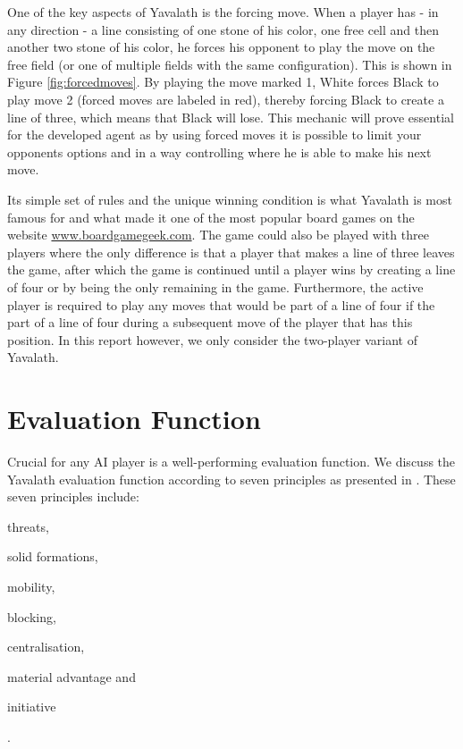 \documentclass[11pt]{article}
\begin{document}


One of the key aspects of Yavalath is the forcing move. When a player has - in any direction - a line consisting of one stone of his color, one free cell and then another two stone of his color, he forces his opponent to play the move on the free field (or one of multiple fields with the same configuration). This is shown in Figure \ref{fig:forcedmoves}. By playing the move marked 1, White forces Black to play move 2 (forced moves are labeled in red), thereby forcing Black to create a line of three, which means that Black will lose. This mechanic will prove essential for the developed agent as by using forced moves it is possible to limit your opponents options and in a way controlling where he is able to make his next move.



Its simple set of rules and the unique winning condition is what Yavalath is most famous for and what made it one of the most popular board games on the website \url{www.boardgamegeek.com}. The game could also be played with three players where the only difference is that a player that makes a line of three leaves the game, after which the game is continued until a player wins by creating a line of four or by being the only remaining in the game. Furthermore, the active player is required to play any moves that would be part of a line of four if the part of a line of four during a subsequent move of the player that has this position. In this report however, we only consider the two-player variant of Yavalath.

\section{Evaluation Function}
\label{-sec:evaluationfunction}

Crucial for any AI player is a well-performing evaluation function. We discuss the Yavalath evaluation function according to seven principles as presented in \cite{Winands2004}. These seven principles include: \begin{enumerate*}\item threats, \item solid formations, \item mobility, \item blocking, \item centralisation, \item material advantage and \item initiative\end{enumerate*}.
\end{document}
